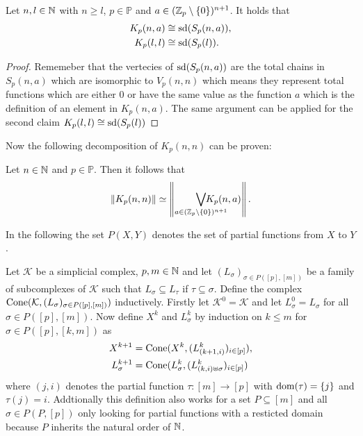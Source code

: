 \begin{rem}\label{rem:kcongs}
  Let $n,l\in\mathbb{N}$ with $n \geq l$, $p\in\mathbb{P}$ and $a\in (\mathbb{Z}_p\setminus\{0\})^{n+1}$. It holds that
  \begin{align*}
    K_p(n,a) &\cong {\rm sd}(S_p(n,a)), \\
    K_p(l,l) &\cong {\rm sd}(S_p(l)).
  \end{align*}
\end{rem}

\begin{proof}
  Rememeber that the vertecies of ${\rm sd}(S_p(n,a))$ are the total chains in $S_p(n,a)$ which are isomorphic to $V_p(n,n)$ which means they represent total functions which are either 0 or have the same value as the function $a$ which is the definition of an element in $K_p(n,a)$. The same argument can be applied for the second claim $K_p(l,l) \cong {\rm sd}(S_p(l))$
\end{proof}

Now the following decomposition of $K_p(n,n)$ can be proven:
\begin{lemma}\label{lem:kpka}
  Let $n\in\mathbb{N}$ and $p\in\mathbb{P}$. Then it follows that
  \begin{equation*}
    \left\lVert K_p(n,n) \right\rVert \simeq \left\lVert \bigvee_{a\in(\Z_p\setminus\{0\})^{n+1}}\hspace*{-24px}K_p(n,a)\right\rVert.
  \end{equation*}
\end{lemma}

In the following the set $P(X, Y)$ denotes the set of partial functions from $X$ to $Y$.

\begin{defin}
  Let $\mathcal{K}$ be a simplicial complex, $p,m \in \mathbb{N}$ and let $(L_\sigma)_{\sigma \in P([p],[m])}$ be a family of subcomplexes of $\mathcal{K}$ such that $L_\sigma \subseteq L_\tau$ if $\tau \subseteq \sigma$. Define the complex ${\rm Cone}(\mathcal{K}, (L_\sigma)_{\sigma\in P([p],[m])})$ inductively. Firstly let $\mathcal{K}^0 = \mathcal{K}$ and let $L_\sigma^0 = L_\sigma$ for all $\sigma \in P([p],[m])$. Now define $X^k$ and $L_\sigma^k$ by induction on $k \leq m$ for $\sigma \in P([p], [k,m])$ as
  \begin{align*}
    X^{k+1} &= {\rm Cone}(X^k, (L^k_{(k+1,i)})_{i\in [p]}), \\
    L^{k+1}_\sigma &= {\rm Cone}(L^k_\sigma, (L^k_{(k,i)\uplus \sigma})_{i\in [p]})
  \end{align*}
  where $(j,i)$ denotes the partial function $\tau\colon [m] \to [p]$ with ${\rm dom}(\tau) = \{j\}$ and $\tau(j) = i$.
  Addtionally this definition also works for a set $P \subseteq [m]$ and all $\sigma \in P(P, [p])$ only looking for partial functions with a resticted domain because $P$ inherits the natural order of $\mathbb{N}$.
\end{defin}

